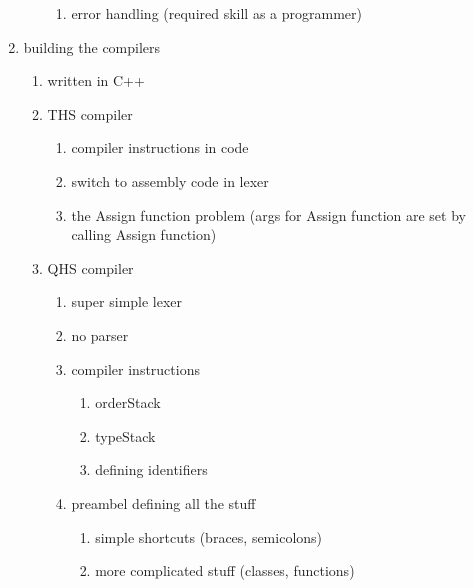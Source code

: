 \documentclass[parskip=full]{scrreprt}
\begin{document}
\begin{enumerate}
\begin{enumerate}
\begin{enumerate}
                            \item error handling (required skill as a programmer)
                        \end{enumerate}
              \end{enumerate}
        \item building the compilers
              \begin{enumerate}
                  \item written in C++
                  \item THS compiler
                        \begin{enumerate}
                            \item compiler instructions in code
                            \item switch to assembly code in lexer
                            \item the Assign function problem (args for Assign function are set by calling Assign function)
                        \end{enumerate}
                  \item QHS compiler
                        \begin{enumerate}
                            \item super simple lexer
                            \item no parser
                            \item compiler instructions
                                  \begin{enumerate}
                                      \item orderStack
                                      \item typeStack
                                      \item defining identifiers
                                  \end{enumerate}
                            \item preambel defining all the stuff
                                  \begin{enumerate}
                                      \item simple shortcuts (braces, semicolons)
                                      \item more complicated stuff (classes, functions)
                                  \end{enumerate}
                        \end{enumerate}
              \end{enumerate}
    \end{enumerate}
\fi







\listoffigures



\end{document}
